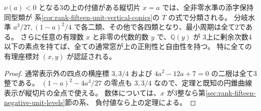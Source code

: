 \begin{corollary}
$\nu(a)<0$ となる3の上の付値がある縦切片 $x=a$ では、全非零水準の添字保持同型類が
系\ref{cor:rank-fifteen-unit-vertical-conics}の $T$ の式で分類される。
分岐水準 $a^3/27,(1-a)^2/4$ で各二類、その他で各四類となり、最小周期は全て2である。
さらに任意の有理数 $x$ と非零の代数的数 $y$ で、$\mathbb Q(y)$ が
3上に剰余次数4以下の素点を持てば、全ての通常窓が上の正則性と自由性を持つ。
特に全ての有理座標対 $(x,y)$ が認証される。
\end{corollary}
\begin{proof}
通常表示外の四点の横座標 $3,3/4$ および $4a^2-12a+7=0$ の二根は全て3整である。
$(1-a)^2-4a^3/27$ の零点も $3,3/4$ なので、定理と既知の円錐曲線表示が縦切片の全点で使える。
数体については、$x$ が3整なら第\ref{sec:rank-fifteen-negative-unit-levels}節の系、
負付値なら上の定理による。
\end{proof}
